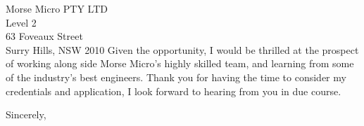 \documentclass[
    backaddress=false,
    foldmarks=false,
    fromalign=right,
    fromrule,
    fromphone,
    fromemail,
    parskip=half,
    refline=nodate
]{scrlttr2}
\begin{document}
\begin{letter}{%
        Morse Micro PTY LTD \\
        Level 2               \\
        63 Foveaux Street     \\
        Surry Hills, NSW 2010}
        Given the opportunity, I would be thrilled at the prospect of working along side Morse Micro's highly skilled team, and learning from some of the industry's best engineers. Thank you for having the time to consider my credentials and application, I look forward to hearing from you in due course.





        \closing{Sincerely,}
    \end{letter}
\end{document}
